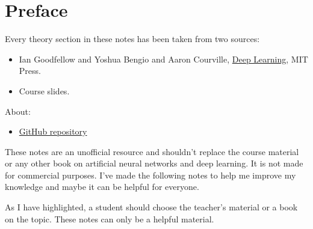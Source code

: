 \section*{Preface}

Every theory section in these notes has been taken from two sources:
\begin{itemize}
    \item Ian Goodfellow and Yoshua Bengio and Aaron Courville, \href{https://www.deeplearningbook.org/}{Deep Learning}, MIT Press. \cite{Goodfellow-et-al-2016}
    \item Course slides.\cite{course-slides-polimi}
\end{itemize}
About:
\begin{itemize}
    \item[\faIcon{github}] \href{https://github.com/PoliMI-HPC-E-notes-projects-AndreVale69/HPC-E-PoliMI-university-notes}{GitHub repository}
    \begin{center}
    \end{center}
\end{itemize}
These notes are an unofficial resource and shouldn't replace the course material or any other book on artificial neural networks and deep learning. It is not made for commercial purposes. I've made the following notes to help me improve my knowledge and maybe it can be helpful for everyone.

As I have highlighted, a student should choose the teacher's material or a book on the topic. These notes can only be a helpful material.
